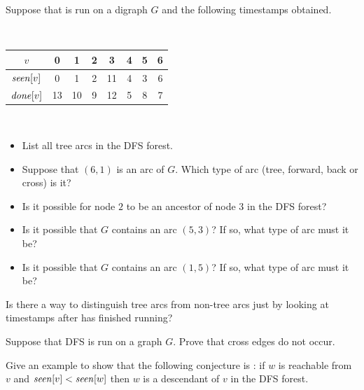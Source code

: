 \begin{Exercise}
\label{ex:DFS-timestamps}
\item Suppose that  is run on a digraph $G$ and the following
timestamps obtained.

\

\begin{tabular}{|c|ccccccc|}
\hline 
$v$ & 0 & 1 & 2 & 3 & 4 & 5 & 6 \\
\hline
$\operatorname{\text{\textit{seen}}}[v]$ & 0 & 1 & 2 & 11 & 4 & 3 & 6 \\
\hline
$\operatorname{\text{\textit{done}}}[v]$ & 13 & 10 & 9 & 12 & 5 & 8 & 7 \\
\hline
\end{tabular}

\

\begin{itemize}
\item 
List all tree arcs in the DFS forest.
\item 
Suppose that $(6,1)$ is an arc of $G$. Which type of arc 
(tree, forward, back or cross) is it?
\item 
Is it possible for node $2$ to be an ancestor of node $3$ in the DFS
forest?
\item
Is it possible that $G$ contains an arc $(5,3)$? If so, what type of arc
must it be?
\item 
Is it possible that $G$ contains an arc $(1,5)$? If so, what type of arc
must it be?
\end{itemize}
\end{Exercise}

\begin{Exercise}
\label{ex:DFS-tree-vs-nontree}
Is there a way to distinguish tree arcs from non-tree arcs just by
looking at timestamps after  has finished running?
\end{Exercise}

\begin{Exercise}
\label{ex:DFS-graph-no-cross}
Suppose that DFS is run on a graph $G$. Prove that cross edges do not occur.
\end{Exercise}

\begin{Exercise}
\label{ex:DFS-false-conj}
Give an example to show that the following conjecture is : if $w$ is reachable from $v$ and $\operatorname{\text{\textit{seen}}}[v] < \operatorname{\text{\textit{seen}}}[w]$ then $w$ is
a descendant of $v$ in the DFS forest.
\end{Exercise}

